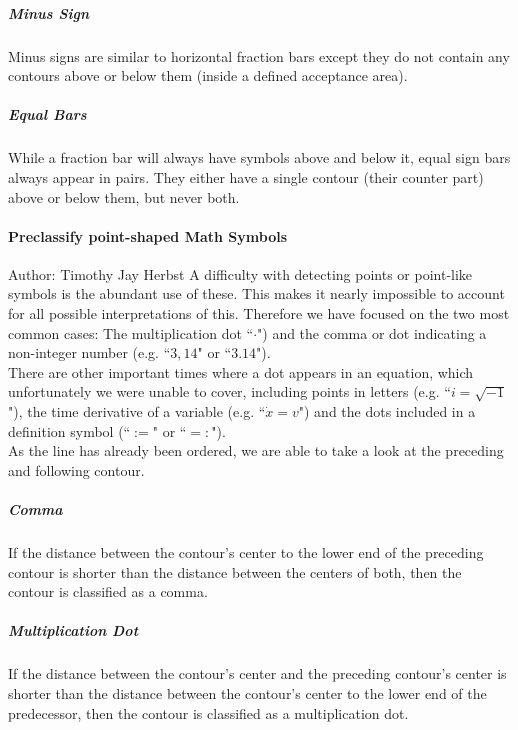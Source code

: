 \documentclass[12pt]{article}
\begin{document}
	\subparagraph{Minus Sign}
	Minus signs are similar to horizontal fraction bars except they do not contain any contours above or below them (inside a defined acceptance area).

	\subparagraph{Equal Bars}\label{equalbars}
	While a fraction bar will always have symbols above and below it, equal sign bars always appear in pairs. They either have a single contour (their counter part) above or below them, but never both.
	
	\paragraph{Preclassify point-shaped Math Symbols}
	\small{Author: Timothy Jay Herbst} \newline \newline
	A difficulty with detecting points or point-like symbols is the abundant use of these.
	This makes it nearly impossible to account for all possible interpretations of this.
	Therefore we have focused on the two most common cases:
	The multiplication dot ``$\cdot$") and the comma or dot indicating a non-integer number (e.g. ``$3,14$" or ``$3.14$").\\
	There are other important times where a dot appears in an equation, which unfortunately we were unable to cover, including points in letters (e.g. ``$i=\sqrt{-1}$"), the time derivative of a variable (e.g. ``$\dot{x}=v$") and the dots included in a definition symbol (``$:=$" or ``$=:$").\\  %
	As the line has already been ordered, we are able to take a look at the preceding and following contour.
	
	\subparagraph{Comma}
	If the distance between the contour's center to the lower end of the preceding contour is shorter than the distance between the centers of both, then the contour is classified as a comma.\\
	
	\subparagraph{Multiplication Dot}
	If the distance between the contour's center and the preceding contour's center is shorter than the distance between the contour's center to the lower end of the predecessor, then the contour is classified as a multiplication dot.\\
\end{document}
